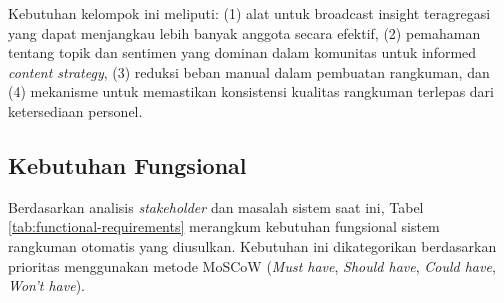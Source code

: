 Kebutuhan kelompok ini meliputi: (1) alat untuk broadcast insight teragregasi yang dapat menjangkau lebih banyak anggota secara efektif, (2) pemahaman tentang topik dan sentimen yang dominan dalam komunitas untuk informed \textit{content strategy}, (3) reduksi beban manual dalam pembuatan rangkuman, dan (4) mekanisme untuk memastikan konsistensi kualitas rangkuman terlepas dari ketersediaan personel.

\subsection{Kebutuhan Fungsional}

Berdasarkan analisis \textit{stakeholder} dan masalah sistem saat ini, Tabel \ref{tab:functional-requirements} merangkum kebutuhan fungsional sistem rangkuman otomatis yang diusulkan. Kebutuhan ini dikategorikan berdasarkan prioritas menggunakan metode MoSCoW (\textit{Must have}, \textit{Should have}, \textit{Could have}, \textit{Won't have}).

